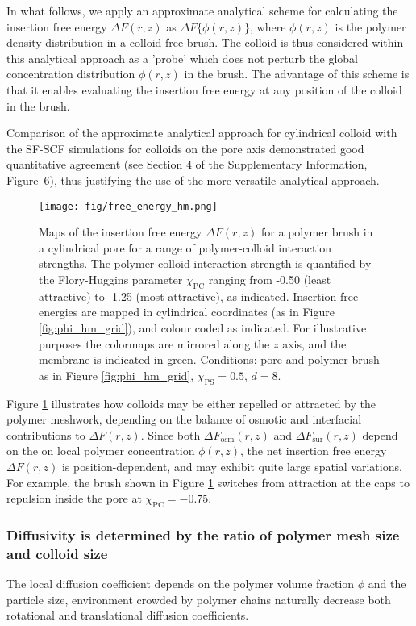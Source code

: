 \documentclass[12pt, a4paper]{article}
\begin{document}
In what follows, we apply an approximate analytical scheme for calculating the insertion free energy $\Delta F(r,z)$ as $\Delta F\{\phi(r,z)\}$, 
where $\phi(r,z)$ is the polymer density distribution in a colloid-free brush. 
The colloid is thus considered within this analytical approach as a 'probe' which does not perturb the global concentration distribution $\phi(r,z)$ in the brush. 
The advantage of this scheme is that it enables evaluating the insertion free energy at any position of the colloid in the brush.

Comparison of the approximate analytical approach for cylindrical colloid with the SF-SCF simulations for colloids on the pore axis demonstrated good quantitative agreement (see Section 4 of the Supplementary Information, Figure~6), 
thus justifying the use of the more versatile analytical approach.

\begin{figure}
    \centering
    \texttt{[image: fig/free\_energy\_hm.png]}
    \caption{
    Maps of the insertion free energy $\Delta F(r,z)$ for a polymer brush in a cylindrical pore for a range of polymer-colloid interaction strengths. 
    The polymer-colloid interaction strength is quantified by the Flory-Huggins parameter $\chi_{\text{PC}}$ ranging from -0.50 (least attractive) to -1.25 (most attractive), as indicated. 
    Insertion free energies are mapped in cylindrical coordinates (as in Figure \ref{fig:phi_hm_grid}), and colour coded as indicated. 
    For illustrative purposes the colormaps are mirrored along the $z$ axis, and the membrane is indicated in green. 
    Conditions: pore and polymer brush as in Figure \ref{fig:phi_hm_grid}, $\chi_{\text{PS}}=0.5$, $d=8$.
    }
    \label{fig:DeltaF_map}
\end{figure}

Figure \ref{fig:DeltaF_map} illustrates how colloids may be either repelled or attracted by the polymer meshwork, 
depending on the balance of osmotic and interfacial contributions to $\Delta F(r,z)$. 
Since both $\Delta F_{\text{osm}}(r,z)$ and $\Delta F_{\text{sur}}(r,z)$ depend on the on local polymer concentration $\phi(r,z)$, 
the net insertion free energy $\Delta F(r,z)$ is position-dependent, and may exhibit quite large spatial variations. 
For example, the brush shown in Figure \ref{fig:DeltaF_map} switches from attraction at the caps to repulsion inside the pore at $\chi_{\text{PC}}=-0.75$.


\subsubsection{Diffusivity is determined by the ratio of polymer mesh size and colloid size}
The local diffusion coefficient depends on the polymer volume fraction $\phi$ and the particle size, environment crowded by polymer chains naturally decrease both rotational \cite{Fu2017} and translational \cite{Stewart1998} diffusion coefficients.
\end{document}
